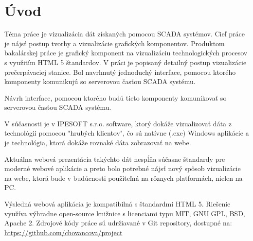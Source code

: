 \chapter*{Úvod}

Téma práce je vizualizácia dát získaných pomocou SCADA systémov. Cieľ práce je nájsť postup tvorby a vizualizácie grafických komponentov. Produktom bakalárskej práce je grafický komponent na vizualizáciu technologických procesov s využitím HTML 5 štandardov. 
V práci je popisaný detailný postup vizualizácie prečerpávaciej stanice. Bol navrhnutý jednoduchý interface, pomocou ktorého komponenty komunikujú so serverovou časťou SCADA systému. 

Návrh  interface, pomocou ktorého budú tieto komponenty komunikovať so serverovou časťou SCADA systému. 

V súčasnosti je v IPESOFT s.r.o. software, ktorý dokáže vizualizovať dáta z technológii pomocou "hrubých klientov",  čo sú natívne (.exe) Windows aplikácie a je technológia,  ktorá dokáže rovnaké dáta zobrazovať na webe. 

Aktuálna webová prezentácia takýchto dát nespĺňa súčasne štandardy pre moderné webové aplikácie a preto bolo potrebné nájsť nový spôsob vizualizácie na webe, ktorá bude v budúcnosti použiteľná na rôznych platformách, nielen na PC. 


Výsledná webová aplikácia je kompatibilná s štandardmi HTML 5. Riešenie využíva výhradne open-source knižnice s licenciami typu MIT, GNU GPL, BSD, Apache 2. Zdrojové kódy práce sú udržiavané v Git repository, dostupné na:  \url{https://github.com/chovancova/project} 


%


